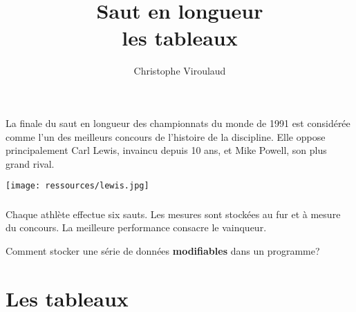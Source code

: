 \documentclass[svgnames,11pt]{beamer}
\author[]{Christophe Viroulaud}
\title{Saut en longueur\\les tableaux}
\date{\framebox{\textbf{DonRep 07}}}
\institute{Première - NSI}
\begin{document}
\begin{frame}
    \titlepage
\end{frame}
\begin{frame}
    \frametitle{}

    La finale du saut en longueur des championnats du monde de 1991 est considérée comme l'un des meilleurs concours de l'histoire de la discipline. Elle oppose principalement Carl Lewis, invaincu depuis 10 ans, et Mike Powell, son plus grand rival.
    \begin{center}
        \centering
        \texttt{[image: ressources/lewis.jpg]}
        \label{IMG}
    \end{center}

\end{frame}
\begin{frame}
    \frametitle{}

    Chaque athlète effectue six sauts. Les mesures sont stockées au fur et à mesure du concours. La meilleure performance consacre le vainqueur.

    \begin{framed}\centering
        Comment stocker une série de données \textbf{modifiables} dans un programme?
    \end{framed}

\end{frame}
\section{Les tableaux}
\end{document}
